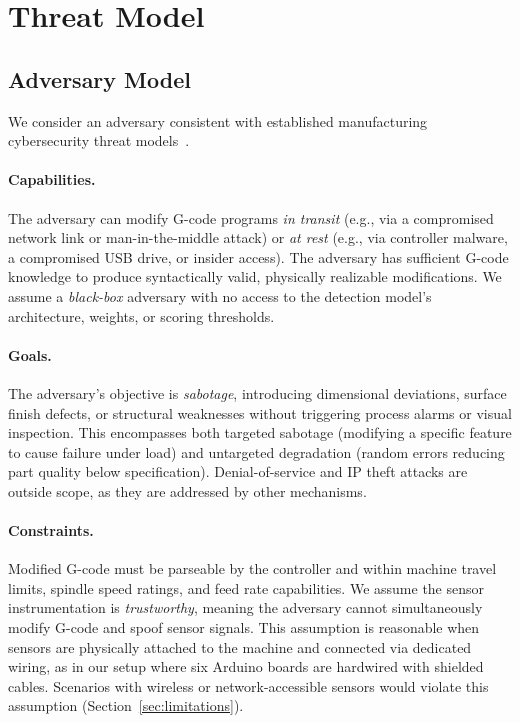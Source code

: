 \section{Threat Model}
\label{sec:threat_model}

\subsection{Adversary Model}
\label{sec:adversary}

We consider an adversary consistent with established manufacturing cybersecurity threat models~\cite{yampolskiy2018security,graves2023cyberphysical,mitre2021attack}.

\paragraph{Capabilities.}
The adversary can modify G-code programs \emph{in transit} (e.g., via a compromised network link or man-in-the-middle attack) or \emph{at rest} (e.g., via controller malware, a compromised USB drive, or insider access).
The adversary has sufficient G-code knowledge to produce syntactically valid, physically realizable modifications.
We assume a \emph{black-box} adversary with no access to the detection model's architecture, weights, or scoring thresholds.

\paragraph{Goals.}
The adversary's objective is \emph{sabotage}, introducing dimensional deviations, surface finish defects, or structural weaknesses without triggering process alarms or visual inspection.
This encompasses both targeted sabotage (modifying a specific feature to cause failure under load) and untargeted degradation (random errors reducing part quality below specification).
Denial-of-service and IP theft attacks are outside scope, as they are addressed by other mechanisms.

\paragraph{Constraints.}
Modified G-code must be parseable by the controller and within machine travel limits, spindle speed ratings, and feed rate capabilities.
We assume the sensor instrumentation is \emph{trustworthy}, meaning the adversary cannot simultaneously modify G-code and spoof sensor signals.
This assumption is reasonable when sensors are physically attached to the machine and connected via dedicated wiring, as in our setup where six Arduino boards are hardwired with shielded cables.
Scenarios with wireless or network-accessible sensors would violate this assumption (Section~\ref{sec:limitations}).


